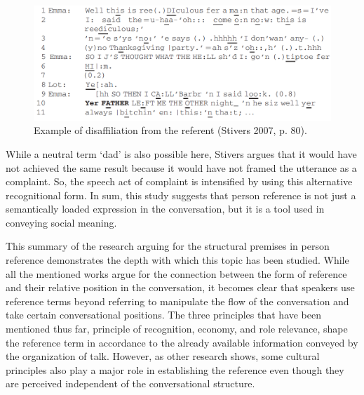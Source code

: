 \documentclass[12pt]{turabian-researchpaper}
\begin{document}
\begin{figure}[h]
\caption{Example of disaffiliation from the referent (Stivers 2007, p. 80).}
\label{stivers}
\includegraphics[width=\linewidth]{stivers}
\end{figure}
While a neutral term `dad' is also possible here, Stivers argues that it would have not achieved the same result because it would have not framed the utterance as a complaint. So, the speech act of complaint is intensified by using this alternative recognitional form. In sum, this study suggests that person reference is not just a semantically loaded expression in the conversation, but it is a tool used in conveying social meaning. 

This summary of the research arguing for the structural premises in person reference demonstrates the depth with which this topic has been studied. While all the mentioned works argue for the connection between the form of reference and their relative position in the conversation, it becomes clear that speakers use reference terms beyond referring to manipulate the flow of the conversation and take certain conversational positions. The three principles that have been mentioned thus far, principle of recognition, economy, and role relevance, shape the reference term in accordance to the already available information conveyed by the organization of talk. However, as other research shows, some cultural principles also play a major role in establishing the reference even though they are perceived independent of the conversational structure. 
  
\end{document}
